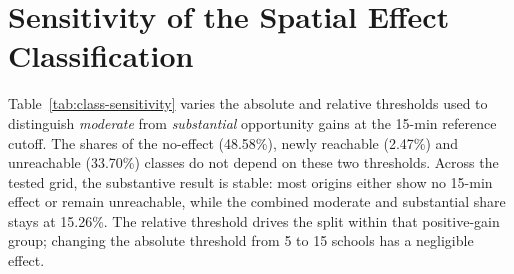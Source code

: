 \documentclass[smartcities,article,submit,moreauthors]{Definitions/mdpi}
\begin{document}

    \appendixstart
    \appendix


    \section{Sensitivity of the Spatial Effect Classification}
    \label{app:class-sensitivity}

    Table~\ref{tab:class-sensitivity} varies the absolute and relative thresholds used to distinguish
    \emph{moderate} from \emph{substantial} opportunity gains at the 15-min reference cutoff. The shares of
    the no-effect (48.58\%), newly reachable (2.47\%) and unreachable (33.70\%) classes do not depend on
    these two thresholds. Across the tested grid, the substantive result is stable: most origins either
    show no 15-min effect or remain unreachable, while the combined moderate and substantial share stays
    at 15.26\%. The relative threshold drives the split within that positive-gain group; changing the
    absolute threshold from 5 to 15 schools has a negligible effect.
\end{document}
